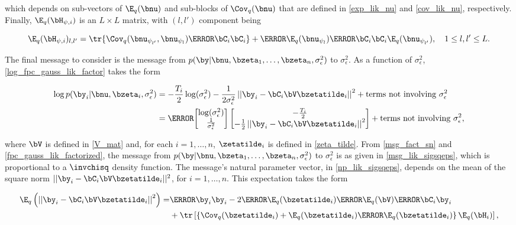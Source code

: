\documentclass[12pt]{article}
\def\sigsqeps{\sigma^2_{\epsilon}}
\newcommand\nupsi[1]{\bnu_{\psi_{#1}}}
\newcommand\Hpsi[1]{\bH_{\psi, i}}
\newcommand\tni[1]{\text{terms not involving $#1$}}
\theoremstyle{plain}
\theoremstyle{definition}
\theoremstyle{remark}
\begin{document}
\noindent which depends on sub-vectors of $\E_q (\bnu)$ and sub-blocks of $\Cov_q (\bnu)$ that are defined
in \eqref{exp_lik_nu} and \eqref{cov_lik_nu}, respectively. Finally, $\E_q (\Hpsi{i})$ is an $L \times L$ matrix,
with $(l, l')$ component being

\begin{equation}
	\E_q (\Hpsi{i})_{l, l'} =
		\tr \{ \Cov_q (\nupsi{l'}, \nupsi{l}) \T{\bC_i} \bC_i \}
		+ \T{\E_q (\nupsi{l})} \T{\bC_i} \bC_i \E_q (\nupsi{l'}), \quad
	1 \le l, l' \le L.
\label{exp_lik_Hpsi}
\end{equation}

The final message to consider is the message from $p (\by | \bnu, \bzeta_1, \dots, \bzeta_n, \sigsqeps)$ to
$\sigsqeps$. As a function of $\sigsqeps$, \eqref{log_fpc_gauss_lik_factor} takes the form

\begin{align*}
	\log p (\by_i | \bnu, \bzeta_i, \sigsqeps)
		& = -\frac{T_i}{2} \log (\sigsqeps) - \frac{1}{2 \sigsqeps} \left|\left|
			\by_i - \bC_i \bV \bzetatilde_i
		\right|\right|^2 + \tni{\sigsqeps} \\
		& = \T{
			\begin{bmatrix}
				\log (\sigsqeps) \\
				\frac{1}{\sigsqeps}
			\end{bmatrix}
		} \begin{bmatrix}
			-\frac{T_i}{2} \\
			-\frac12 \left|\left| \by_i - \bC_i \bV \bzetatilde_i \right|\right|^2
		\end{bmatrix} + \tni{\sigsqeps},
\end{align*}

\noindent where $\bV$ is defined in \eqref{V_mat} and, for each $i = 1, \dots, n$, $\zetatilde_i$ is defined in
\eqref{zeta_tilde}.
From \eqref{msg_fact_sn} and \eqref{fpc_gauss_lik_factorized}, the message from $p (\by | \bnu,
\bzeta_1, \dots, \bzeta_n, \sigsqeps)$ to $\sigsqeps$ is as given in \eqref{msg_lik_sigsqeps}, which is proportional
to a $\invchisq$ density function. The message's natural parameter vector, in \eqref{np_lik_sigsqeps}, depends
on the mean of the square norm $|| \by_i - \bC_i \bV \bzetatilde_i ||^2$, for $i = 1, \dots, n$.
This expectation takes the form

\begin{align*}
	\E_q \left(
		\left|\left| \by_i - \bC_i \bV \bzetatilde_i \right|\right|^2
	\right) =
		& \T{\by_i} \by_i - 2 \T{\E_q (\bzetatilde_i)} \T{\E_q (\bV)} \T{\bC_i} \by_i \\
		& + \tr \left[
			\left\{ \Cov_q (\bzetatilde_i) + \E_q (\bzetatilde_i) \T{\E_q (\bzetatilde_i)} \right\} \E_q (\bH_i)
		\right],
\end{align*}
\end{document}
